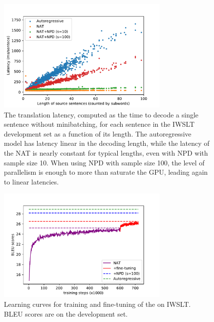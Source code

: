 \begin{figure}[hptb]
\centering
\includegraphics[width=0.75\textwidth]{figs/nat/length_vs_latency}
\caption{\label{cp8.fig.latency}The translation latency, computed as the time to decode a single sentence without minibatching, for each sentence in the IWSLT development set as a function of its length. The autoregressive model has latency linear in the decoding length, while the latency of the NAT is nearly constant for typical lengths, even with NPD with sample size 10. When using NPD with sample size 100, the level of parallelism is enough to more than saturate the GPU, leading again to linear latencies.}
\end{figure}

\begin{figure}[hptb]
\centering
\includegraphics[width=0.75\textwidth]{figs/nat/learning_curve}
\caption{\label{cp8.fig.curve}Learning curves for training and fine-tuning of the \model{} on IWSLT. BLEU scores are on the development set.}
\end{figure}

